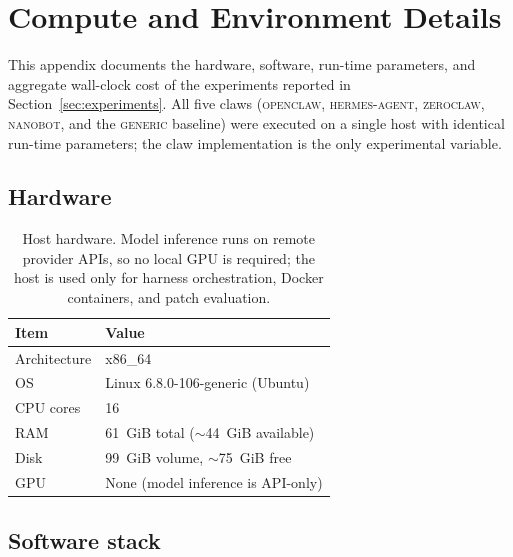 \section{ Compute and Environment Details}\label{appendix:compute}

This appendix documents the hardware, software, run-time parameters, and aggregate
wall-clock cost of the experiments reported in Section~\ref{sec:experiments}. All five
claws (\textsc{openclaw}, \textsc{hermes-agent}, \textsc{zeroclaw}, \textsc{nanobot},
and the \textsc{generic} baseline)
were executed on a single host with identical run-time parameters; the claw
implementation is the only experimental variable.

\subsection{Hardware}

\begin{table}[h]
\centering
\small
\begin{tabular}{ll}
\toprule
\textbf{Item} & \textbf{Value} \\
\midrule
Architecture & x86\_64 \\
OS           & Linux 6.8.0-106-generic (Ubuntu) \\
CPU cores    & 16 \\
RAM          & 61~GiB total ($\sim$44~GiB available) \\
Disk         & 99~GiB volume, $\sim$75~GiB free \\
GPU          & None (model inference is API-only) \\
\bottomrule
\end{tabular}
\caption{Host hardware. Model inference runs on remote provider APIs, so no local
GPU is required; the host is used only for harness orchestration, Docker
containers, and patch evaluation.}
\label{tab:appx-d-hardware}
\end{table}

\subsection{Software stack}

